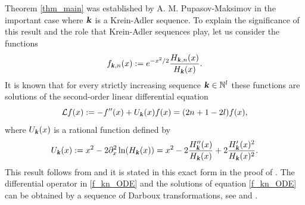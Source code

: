 \documentclass[12pt]{article}
\def\n{{\mathbb N}}
\def\k{\textbf{\textsl{k}}}
\begin{document}
Theorem \ref{thm_main} was established by A. M. Pupasov-Maksimov \cite{Pupasov_2015} in the important case where $\k$ is a  Krein-Adler sequence. To explain the significance of this result and the role that Krein-Adler sequences play, let us consider the functions  
\begin{equation}\label{def_fkn}
f_{\k,n}(x):=e^{-x^2/2} 
\frac{H_{\k,n}(x)}{H_{\k}(x)}. 
\end{equation}
It is known that for every strictly increasing sequence $\k \in \n^l$ these functions 
are solutions of the second-order linear differential equation 
\begin{equation}\label{f_kn_ODE}
{\mathcal L} f(x):=-f''(x)+U_{\k}(x) f(x)=(2n+1-2l) f(x),
\end{equation}
where $U_{\k}(x)$ is a rational function defined by
\begin{equation*}
U_{\k}(x):= x^2- 2\partial_x^2 \ln(H_{\k}(x))=
 x^2 - 2\frac{H_{\k}''(x)}{H_{\k}(x)}+
 2\frac{H_{\k}'(x)^2}{H_{\k}(x)^2}.
\end{equation*}
This  result follows from \cite[Proposition 5.2]{Gomez-Ullate_2014} and it is stated in this exact form in the proof of \cite[Proposition 5.5]{Gomez-Ullate_2014}. The differential operator in \eqref{f_kn_ODE} and the solutions of equation \eqref{f_kn_ODE} can be obtained by a sequence of Darboux transformations, see \cite[Theorem 3]{Oblomkov1999} and \cite{Gomez-Ullate_2014}.
\end{document}
